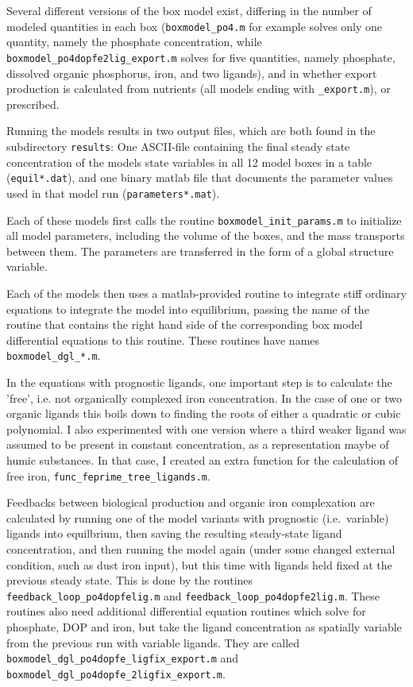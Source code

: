 \documentclass[a4paper,titlepage=false]{scrartcl}
\begin{document}
Several different versions of the box model exist, differing in the
number of modeled quantities in each box (\verb+boxmodel_po4.m+ for
example solves only one quantity, namely the phosphate concentration,
while \verb+boxmodel_po4dopfe2lig_export.m+ solves for five
quantities, namely phosphate, dissolved organic phosphorus, iron, and
two ligands), and in whether export production is calculated from
nutrients (all models ending with \verb+_export.m+), or
prescribed.

Running the models results in two output files, which are
both found in the subdirectory \verb+results+: One ASCII-file
containing the final steady state concentration of the models state
variables in all 12 model boxes in a table (\verb+equil*.dat+), and
one binary matlab file that documents the parameter values used in
that model run (\verb+parameters*.mat+).

Each of these models first calls the routine
\verb+boxmodel_init_params.m+ to initialize all model parameters,
including the volume of the boxes, and the mass transports between
them. The parameters are transferred in the form of a global
structure variable. 

Each of the models then uses a matlab-provided routine to integrate
stiff ordinary equations to integrate the model into equilibrium,
passing the name of the routine that contains the right hand side of
the corresponding box model differential equations to this
routine. These routines have names \verb+boxmodel_dgl_*.m+.

In the equations with prognostic ligands, one important step is to
calculate the 'free', i.e. not organically complexed iron
concentration. In the case of one or two organic ligands this boils
down to finding the roots of either a quadratic or cubic polynomial. I
also experimented with one version where a third weaker ligand was
assumed to be present in constant concentration, as a representation
maybe of humic substances. In that case, I created an extra function
for the calculation of free iron, \verb+func_feprime_tree_ligands.m+. 

Feedbacks between biological production and organic iron complexation
are calculated by running one of the model variants with prognostic
(i.e.\ variable) ligands into equilbrium, then saving the resulting
steady-state ligand concentration, and then running the model again
(under some changed external condition, such as dust iron input), but
this time with ligands held fixed at the previous steady state. This
is done by the routines \verb+feedback_loop_po4dopfelig.m+ and
\verb+feedback_loop_po4dopfe2lig.m+. These routines also need
additional differential equation routines which solve for phosphate,
DOP and iron, but take the ligand concentration as spatially variable
from the previous run with variable ligands. They are called
\verb+boxmodel_dgl_po4dopfe_ligfix_export.m+ and
\verb+boxmodel_dgl_po4dopfe_2ligfix_export.m+.
\end{document}
